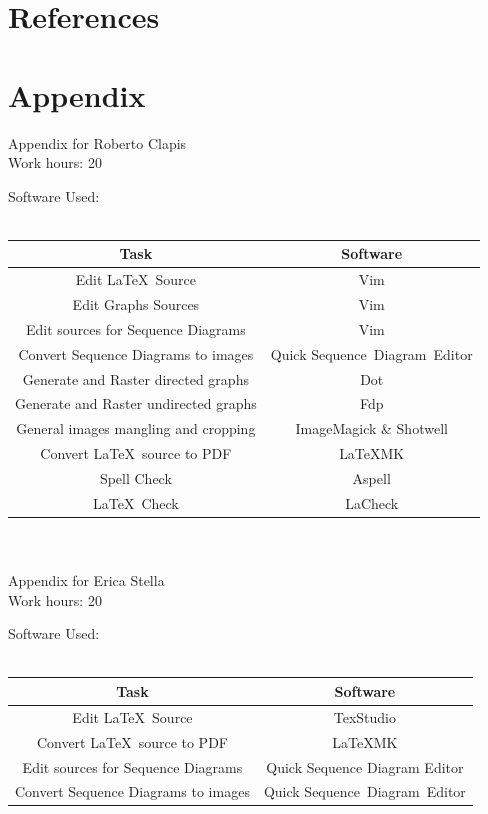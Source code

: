 \documentclass{article}
\begin{document}
\section{References}
\clearpage
\section{Appendix}
Appendix for Roberto Clapis\\
Work hours: 20
\begin{center}
	Software Used:\\
	\-\\
	\begin{tabular}{*{2}{c}}
		\toprule
		Task & Software \\
		\midrule
		Edit \LaTeX\ Source & Vim\\
		Edit Graphs Sources & Vim\\
		Edit sources for Sequence Diagrams & Vim\\
		Convert Sequence Diagrams to images & Quick Sequence Diagram Editor\\
		Generate and Raster directed graphs& Dot\\
		Generate and Raster undirected graphs& Fdp\\
		General images mangling and cropping & ImageMagick \& Shotwell\\
		Convert \LaTeX\ source to PDF & \LaTeX\-MK\\
		Spell Check & Aspell \\
		\LaTeX\ Check & LaCheck\\
		\bottomrule
	\end{tabular}
\end{center}
\-\\
\-\\
Appendix for Erica Stella\\
Work hours: 20
\begin{center}
	Software Used:\\
	\-\\
	\begin{tabular}{*{2}{c}}
		\toprule
		Task & Software \\
		\midrule
		Edit \LaTeX\ Source & TexStudio\\
		Convert \LaTeX\ source to PDF & \LaTeX\-MK\\
		Edit sources for Sequence Diagrams & Quick Sequence Diagram Editor\\
		Convert Sequence Diagrams to images & Quick Sequence Diagram Editor\\
		\bottomrule
	\end{tabular}
\end{center}
\end{document}
